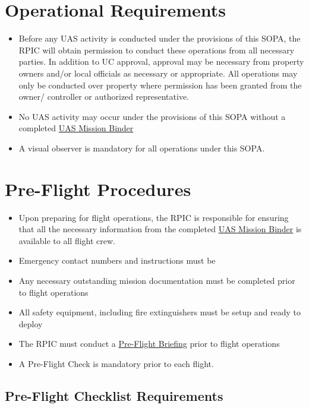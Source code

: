 \documentclass[
]{book}
\providecommand{\tightlist}{%
  \setlength{\itemsep}{0pt}\setlength{\parskip}{0pt}}
\begin{document}
\section{Operational Requirements}\label{operational-requirements}

\begin{itemize}
\tightlist
\item
  Before any UAS activity is conducted under the provisions of this SOPA, the RPIC will obtain permission to conduct these operations from all necessary parties. In addition to UC approval, approval may be necessary from property owners and/or local officials as necessary or appropriate. All operations may only be conducted over property where permission has been granted from the owner/ controller or authorized representative.\\
\item
  No UAS activity may occur under the provisions of this SOPA without a completed \hyperref[ch-mission-binder]{UAS Mission Binder}
\item
  A visual observer is mandatory for all operations under this SOPA.
\end{itemize}

\section{Pre-Flight Procedures}\label{pre-flight-procedures}

\begin{itemize}
\tightlist
\item
  Upon preparing for flight operations, the RPIC is responsible for ensuring that all the necessary information from the completed \hyperref[ch-mission-binder]{UAS Mission Binder} is available to all flight crew.
\item
  Emergency contact numbers and instructions must be
\item
  Any necessary outstanding mission documentation must be completed prior to flight operations
\item
  All safety equipment, including fire extinguishers must be setup and ready to deploy
\item
  The RPIC must conduct a \hyperref[pfb]{Pre-Flight Briefing} prior to flight operations
\item
  A Pre-Flight Check is mandatory prior to each flight.
\end{itemize}

\subsection{Pre-Flight Checklist Requirements}\label{pre-flight-checklist-requirements}
\end{document}
